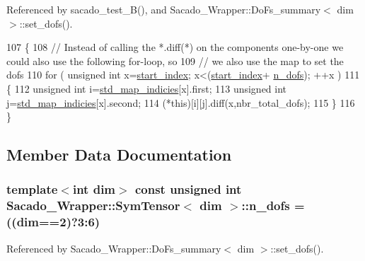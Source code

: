 Referenced by sacado\+\_\+test\+\_\+B(), and Sacado\+\_\+\+Wrapper\+::\+Do\+Fs\+\_\+summary$<$ dim $>$\+::set\+\_\+dofs().


\begin{DoxyCode}
107     \{
108         \textcolor{comment}{// Instead of calling the *.diff(*) on the components one-by-one we could also use the following
       for-loop, so}
109         \textcolor{comment}{// we also use the map to set the dofs}
110         \textcolor{keywordflow}{for} ( \textcolor{keywordtype}{unsigned} \textcolor{keywordtype}{int} x=\hyperlink{classSacado__Wrapper_1_1SymTensor_afe921e6044e4110fcfc848c52844d650}{start\_index}; x<(\hyperlink{classSacado__Wrapper_1_1SymTensor_afe921e6044e4110fcfc848c52844d650}{start\_index}+
      \hyperlink{classSacado__Wrapper_1_1SymTensor_a733bc4b029ff8d067b48e7ce3ee7606b}{n\_dofs}); ++x )
111         \{
112             \textcolor{keywordtype}{unsigned} \textcolor{keywordtype}{int} i=\hyperlink{classSacado__Wrapper_1_1SymTensor_ae3b1c56cde3fc5c7805b618ef3d9de75}{std\_map\_indicies}[x].first;
113             \textcolor{keywordtype}{unsigned} \textcolor{keywordtype}{int} j=\hyperlink{classSacado__Wrapper_1_1SymTensor_ae3b1c56cde3fc5c7805b618ef3d9de75}{std\_map\_indicies}[x].second;
114             (*this)[i][j].diff(x,nbr\_total\_dofs);
115         \}
116     \}
\end{DoxyCode}


\subsection{Member Data Documentation}
\subsubsection[{\texorpdfstring{n\+\_\+dofs}{n_dofs}}]{\setlength{\rightskip}{0pt plus 5cm}template$<$int dim$>$ const unsigned int {\bf Sacado\+\_\+\+Wrapper\+::\+Sym\+Tensor}$<$ dim $>$\+::n\+\_\+dofs = ((dim==2)?3\+:6)\hspace{0.3cm}{\ttfamily [static]}}\hypertarget{classSacado__Wrapper_1_1SymTensor_a733bc4b029ff8d067b48e7ce3ee7606b}{}\label{classSacado__Wrapper_1_1SymTensor_a733bc4b029ff8d067b48e7ce3ee7606b}


Referenced by Sacado\+\_\+\+Wrapper\+::\+Do\+Fs\+\_\+summary$<$ dim $>$\+::set\+\_\+dofs().

